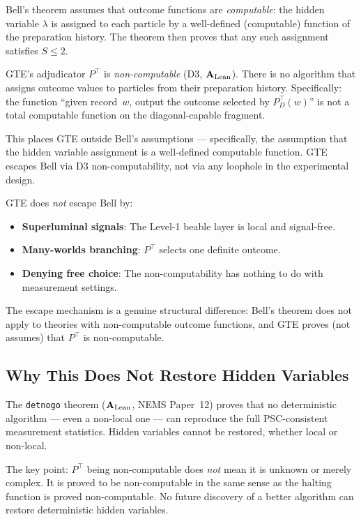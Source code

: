 \documentclass[11pt,openany]{book}
\theoremstyle{remark}
\newcommand{\lean}[1]{%
  \penalty-100
  \begingroup\def\_{\textunderscore\allowbreak}\texttt{#1}\endgroup}
\newcommand{\CatAL}{\ensuremath{\textbf{A}_{\rm Lean}}}
\begin{document}
Bell's theorem assumes that outcome functions are \emph{computable}: the hidden variable
$\lambda$ is assigned to each particle by a well-defined (computable) function of the
preparation history.  The theorem then proves that any such assignment satisfies
$S \leq 2$.

GTE's adjudicator $P^\top$ is \emph{non-computable} (D3, \CatAL).  There is no
algorithm that assigns outcome values to particles from their preparation history.
Specifically: the function ``given record~$w$, output the outcome selected by
$P^\top_D(w)$'' is not a total computable function on the diagonal-capable fragment.

This places GTE outside Bell's assumptions --- specifically, the assumption that the
hidden variable assignment is a well-defined computable function.  GTE escapes Bell
via D3 non-computability, not via any loophole in the experimental design.

GTE does \emph{not} escape Bell by:
\begin{itemize}
\item \textbf{Superluminal signals}: The Level-1 beable layer is local and signal-free.
\item \textbf{Many-worlds branching}: $P^\top$ selects one definite outcome.
\item \textbf{Denying free choice}: The non-computability has nothing to do with
  measurement settings.
\end{itemize}

The escape mechanism is a genuine structural difference: Bell's theorem does not apply
to theories with non-computable outcome functions, and GTE proves (not assumes) that
$P^\top$ is non-computable.

\subsection*{Why This Does Not Restore Hidden Variables}

The \lean{det\_no\_go} theorem (\CatAL, NEMS Paper~12) proves that no deterministic
algorithm --- even a non-local one --- can reproduce the full PSC-consistent measurement
statistics.  Hidden variables cannot be restored, whether local or non-local.

The key point: $P^\top$ being non-computable does \emph{not} mean it is unknown or
merely complex.  It is proved to be non-computable in the same sense as the halting
function is proved non-computable.  No future discovery of a better algorithm can
restore deterministic hidden variables.
\end{document}
